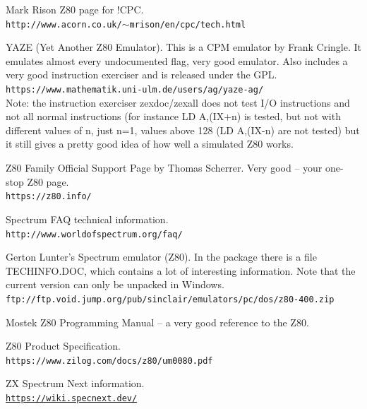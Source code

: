 \begin{thebibliography}{}

	  Mark Rison Z80 page for !CPC. \\
	{\tt \small http://www.acorn.co.uk/$\sim$mrison/en/cpc/tech.html}

	 YAZE (Yet Another Z80 Emulator). This is a CPM emulator by Frank Cringle. It emulates almost every undocumented flag, very good emulator. Also includes a very good instruction exerciser and is released under the GPL. \\
	{\tt \small https://www.mathematik.uni-ulm.de/users/ag/yaze-ag/} \\
	Note: the instruction exerciser zexdoc/zexall does not test I/O instructions and not all normal instructions (for instance LD A,(IX+n) is tested, but not with different values of n, just n=1, values above 128 (LD A,(IX-n) are not tested) but it still gives a pretty good idea of how well a simulated Z80 works.

	 Z80 Family Official Support Page by Thomas Scherrer. Very good -- your one-stop Z80 page. \\
	{\tt \small https://z80.info/}

	 Spectrum FAQ technical information. \\
	{\tt \small http://www.worldofspectrum.org/faq/}

	 Gerton Lunter's Spectrum emulator (Z80). In the package there is a file TECHINFO.DOC, which contains a lot of interesting information. Note that the current version can only be unpacked in Windows. \\
	{\tt \small ftp://ftp.void.jump.org/pub/sinclair/emulators/pc/dos/z80-400.zip}

	 Mostek Z80 Programming Manual -- a very good reference to the Z80.

	 Z80 Product Specification. \\
	{\tt \small https://www.zilog.com/docs/z80/um0080.pdf}

	 ZX Spectrum Next information. \\
	{\tt \small \url{https://wiki.specnext.dev/}}

\end{thebibliography}

\pagebreak
\IntentionallyEmpty
\pagebreak
